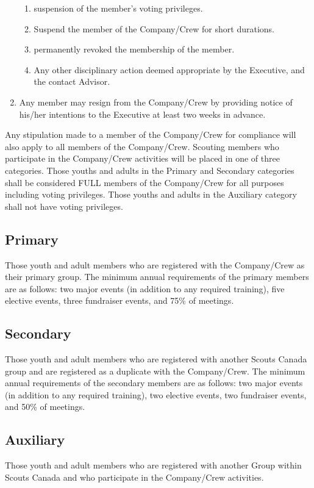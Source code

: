 \begin{enumerate}
    \begin{enumerate}
        \item suspension of the member's voting privileges.
        \item Suspend the member of the Company/Crew for short durations.
        \item permanently revoked the membership of the member.
        \item Any other disciplinary action deemed appropriate by the Executive, and the contact Advisor.
    \end{enumerate}
    \item Any member may resign from the Company/Crew by providing notice of his/her intentions to the Executive at least two weeks in advance.
\end{enumerate}
Any stipulation made to a member of the Company/Crew for compliance will also apply to all members of the Company/Crew.
Scouting members who participate in the Company/Crew activities will be placed in one of three categories.
Those youths and adults in the Primary and Secondary categories shall be considered FULL members of the Company/Crew for all purposes including voting privileges.
Those youths and adults in the Auxiliary category shall not have voting privileges.

\subsection{Primary}\label{subsec:primary}
Those youth and adult members who are registered with the Company/Crew as their primary group.
The minimum annual requirements of the primary members are as follows: two major events (in addition to any required training), five elective events, three fundraiser events, and 75\% of meetings.

\subsection{Secondary}\label{subsec:secondary}
Those youth and adult members who are registered with another Scouts Canada group and are registered as a duplicate with the Company/Crew.
The minimum annual requirements of the secondary members are as follows: two major events (in addition to any required training), two elective events, two fundraiser events, and 50\% of meetings.

\subsection{Auxiliary}\label{subsec:auxiliary}
Those youth and adult members who are registered with another Group within Scouts Canada and who participate in the Company/Crew activities.